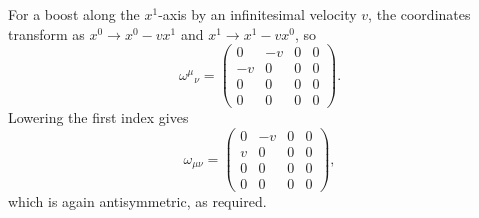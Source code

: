 \begin{solution}
    For a boost along the $x^1$-axis by an infinitesimal velocity $v$, the coordinates
    transform as $x^0 \to x^0 - v x^1$ and $x^1 \to x^1 - v x^0$, so
    \begin{equation}
        \omega^\mu{}_\nu =
        \begin{pmatrix}
            0 & -v & 0 & 0 \\
            -v & 0 & 0 & 0 \\
            0 & 0 & 0 & 0 \\
            0 & 0 & 0 & 0
        \end{pmatrix}.
    \end{equation}
    Lowering the first index gives
    \begin{equation}
        \omega_{\mu\nu} =
        \begin{pmatrix}
            0 & -v & 0 & 0 \\
            v & 0 & 0 & 0 \\
            0 & 0 & 0 & 0 \\
            0 & 0 & 0 & 0
        \end{pmatrix},
    \end{equation}
    which is again antisymmetric, as required.

\end{solution}
